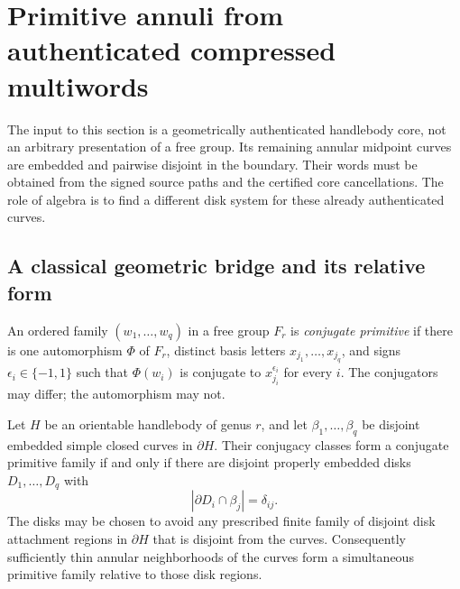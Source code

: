 
\section{Primitive annuli from authenticated compressed multiwords}
\label{sec:primitive}

The input to this section is a geometrically authenticated handlebody core,
not an arbitrary presentation of a free group.  Its remaining annular
midpoint curves are embedded and pairwise disjoint in the boundary.  Their
words must be obtained from the signed source paths and the certified core
cancellations.  The role of algebra is to find a different disk system for
these already authenticated curves.

\subsection{A classical geometric bridge and its relative form}

An ordered family $(w_1,\ldots,w_q)$ in a free group $F_r$ is
\emph{conjugate primitive} if there is one automorphism $\Phi$ of $F_r$,
distinct basis letters $x_{j_1},\ldots,x_{j_q}$, and signs
$\epsilon_i\in\{-1,1\}$ such that $\Phi(w_i)$ is conjugate to
$x_{j_i}^{\epsilon_i}$ for every $i$.  The conjugators may differ; the
automorphism may not.

\begin{proposition}
\label{prop:bridge}
Let $H$ be an orientable handlebody of genus $r$, and let
$\beta_1,\ldots,\beta_q$ be disjoint embedded simple closed curves in
$\partial H$.  Their conjugacy classes form a conjugate primitive family
if and only if there are disjoint properly embedded disks
$D_1,\ldots,D_q$ with
\[
 |\partial D_i\cap\beta_j|=\delta_{ij}.
\]
The disks may be chosen to avoid any prescribed finite family of disjoint
disk attachment regions in $\partial H$ that is disjoint from the curves.
Consequently sufficiently thin annular neighborhoods of the curves form
a simultaneous primitive family relative to those disk regions.
\end{proposition}

